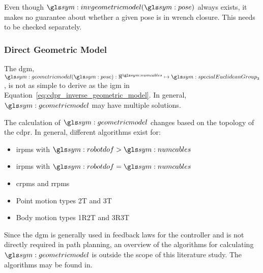 			Even though $\invgeometricmodel(\pose)$ always exists, it  makes  no
			guarantee about whether a given pose is  in  wrench  closure.	This
            needs to be checked separately.

        \subsubsection{Direct Geometric Model}%
        \label{sec:direct_geometric_model}

            The \gls{dgm},
            \(
                \geometricmodel(\pose):\Re^{\numcables}\mapsto\specialEuclideanGroup{3}
            \),
			is	 not   as	simple	 to   derive	as	  the	 \gls{igm}	  in
            Equation~\ref{eq:cdpr_inverse_geometric_model}. In general,
            $\geometricmodel$ may have multiple solutions.

			The calculation of $\geometricmodel$ changes based on  the	topology
			of the \gls{cdpr}.	In	general,  different  algorithms  exist	for:

            \begin{itemize}

                \item[]

                    \glspl{irpm} with $\robotdof > \numcables$

                \item[]

                    \glspl{irpm} with $\robotdof = \numcables$

                \item[]

                    \glspl{crpm} and \glspl{rrpm}

                \item[]

                    Point motion types 2T and 3T

                \item[]

                    Body motion types 1R2T and 3R3T

            \end{itemize}

			Since  the	\gls{dgm}	is	 generally	 used	in	 feedback	laws
			for  the  controller    and  is  not	directly
			required in  path  planning,  an  overview	of	the  algorithms  for
			calculating  $\geometricmodel$	is	outside  the   scope   of	this
			literature study.  The algorithms may  be  found  in.

